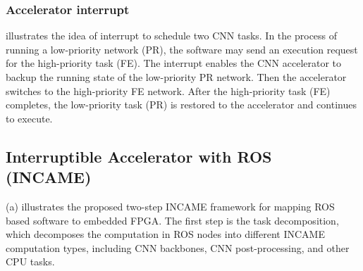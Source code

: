 \subsubsection{Accelerator interrupt}  illustrates the idea of interrupt to schedule two CNN tasks. In the process of running a low-priority network (PR), the software may send an execution request for the high-priority task (FE). The interrupt enables the CNN accelerator to backup the running state of the low-priority PR network. Then the accelerator switches to the high-priority FE network. After the high-priority task (FE) completes, the low-priority task (PR) is restored to the accelerator and continues to execute.





\subsection{ Interruptible Accelerator with ROS (INCAME) }


(a) illustrates the proposed two-step INCAME framework for mapping ROS based software to embedded FPGA.
The first step is the task decomposition, which decomposes the computation in ROS nodes into different INCAME computation types, including CNN backbones, CNN post-processing, and other CPU tasks. 

